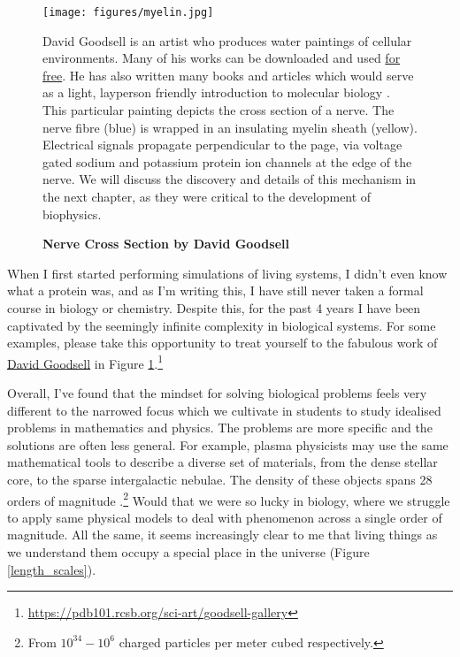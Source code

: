 \begin{figure}[h]
	\begin{center}
		\texttt{[image: figures/myelin.jpg]}
	\end{center}
	\captionsetup{singlelinecheck = false, justification=raggedright}
	\caption[Nerve Cross Section by David Goodsell] {\textbf{Nerve Cross Section by David Goodsell}}{David Goodsell is an artist who produces water paintings of cellular environments. Many of his works can be downloaded and used \href{https://pdb101.rcsb.org/sci-art/goodsell-gallery}{for free}. He has also written many books and articles which would serve as a light, layperson friendly introduction to molecular biology \cite{goodsell2009, goodsell2018, goodsell2020}. This particular painting depicts the cross section of a nerve. The nerve fibre (blue) is wrapped in an insulating myelin sheath (yellow). Electrical signals propagate perpendicular to the page, via voltage gated sodium and potassium protein ion channels at the edge of the nerve\cite{goodsell_nerve}. We will discuss the discovery and details of this mechanism in the next chapter, as they were critical to the development of biophysics.}
	\label{goodsell_figure}
\end{figure}

When I first started performing simulations of living systems, I didn't even know what a protein was, and as I'm writing this, I have still never taken a formal course in biology or chemistry. Despite this, for the past 4 years I have been captivated by the seemingly infinite complexity in biological systems. For some examples, please take this opportunity to treat yourself to the fabulous work of \href {https://pdb101.rcsb.org/sci-art/goodsell-gallery}{David Goodsell} in Figure \ref{goodsell_figure}.\footnote{\href{https://pdb101.rcsb.org/sci-art/goodsell-gallery}{https://pdb101.rcsb.org/sci-art/goodsell-gallery}} 

Overall, I've found that the mindset for solving biological problems feels very different to the narrowed focus which we cultivate in students to study idealised problems in mathematics and physics. The problems are more specific and the solutions are often less general. For example, plasma physicists may use the same mathematical tools to describe a diverse set of materials, from the dense stellar core, to the sparse intergalactic nebulae. The density of these objects spans 28 orders of magnitude \cite{chen2018}.\footnote{From $10^{34}-10^6$ charged particles per meter cubed respectively.} Would that we were so lucky in biology, where we struggle to apply same physical models to deal with phenomenon across a single order of magnitude. All the same, it seems increasingly clear to me that living things as we understand them occupy a special place in the universe (Figure \ref{length_scales}). 



